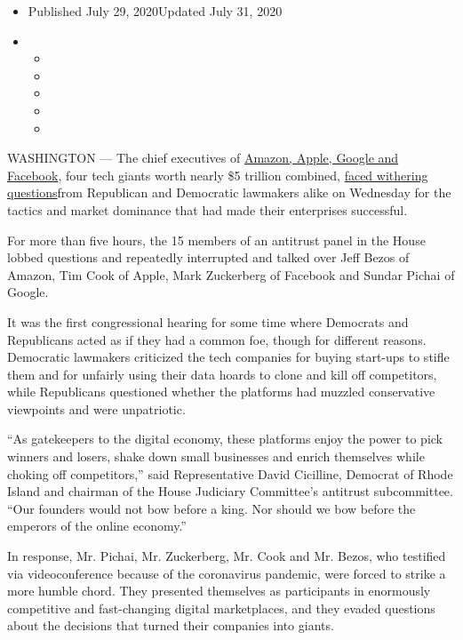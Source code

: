 \begin{itemize}
\item
  Published July 29, 2020Updated July 31, 2020
\item
  \begin{itemize}
  \item
  \item
  \item
  \item
  \item
  \end{itemize}
\end{itemize}

WASHINGTON --- The chief executives of
\href{https://www.nytimes3xbfgragh.onion/2020/07/30/podcasts/the-daily/congress-facebook-amazon-google-apple.html}{Amazon,
Apple, Google and Facebook}, four tech giants worth nearly \$5 trillion
combined,
\href{https://www.nytimes3xbfgragh.onion/live/2020/07/29/technology/tech-ceos-hearing-testimony}{faced
withering questions}from Republican and Democratic lawmakers alike on
Wednesday for the tactics and market dominance that had made their
enterprises successful.

For more than five hours, the 15 members of an antitrust panel in the
House lobbed questions and repeatedly interrupted and talked over Jeff
Bezos of Amazon, Tim Cook of Apple, Mark Zuckerberg of Facebook and
Sundar Pichai of Google.

It was the first congressional hearing for some time where Democrats and
Republicans acted as if they had a common foe, though for different
reasons. Democratic lawmakers criticized the tech companies for buying
start-ups to stifle them and for unfairly using their data hoards to
clone and kill off competitors, while Republicans questioned whether the
platforms had muzzled conservative viewpoints and were unpatriotic.

``As gatekeepers to the digital economy, these platforms enjoy the power
to pick winners and losers, shake down small businesses and enrich
themselves while choking off competitors,'' said Representative David
Cicilline, Democrat of Rhode Island and chairman of the House Judiciary
Committee's antitrust subcommittee. ``Our founders would not bow before
a king. Nor should we bow before the emperors of the online economy.''

In response, Mr. Pichai, Mr. Zuckerberg, Mr. Cook and Mr. Bezos, who
testified via videoconference because of the coronavirus pandemic, were
forced to strike a more humble chord. They presented themselves as
participants in enormously competitive and fast-changing digital
marketplaces, and they evaded questions about the decisions that turned
their companies into giants.

